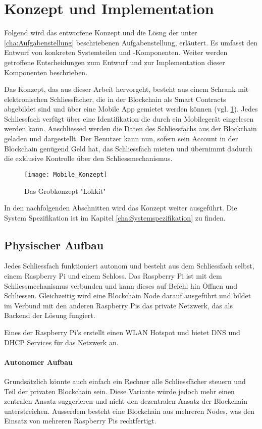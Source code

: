 \section{Konzept und Implementation}
\label{sec:Konzeption}
Folgend wird das entworfene Konzept und die Lösng der unter \ref{cha:Aufgabenstellung} beschriebenen Aufgabenstellung, erläutert. Es umfasst den Entwurf von konkreten Systemteilen und -Komponenten. Weiter werden getroffene Entscheidungen zum Entwurf und zur Implementation dieser Komponenten beschrieben.

Das Konzept, das aus dieser Arbeit hervorgeht, besteht aus einem Schrank mit elektronischen Schliessfächer, die in der Blockchain als Smart Contracts abgebildet sind und über eine Mobile App gemietet werden können (vgl. \ref{fig:Grobkonzept}). Jedes Schliessfach verfügt über eine Identifikation die durch ein Mobilegerät eingelesen werden kann. Anschliessed werden die Daten des Schliessfachs aus der Blockchain geladen und dargestellt. Der Benutzer kann nun, sofern sein Account in der Blockchain genügend Geld hat, das Schliessfach mieten und übernimmt dadurch die exklusive Kontrolle über den Schliessmechanismus. 

\begin{figure}
\centering
\texttt{[image: Mobile\_Konzept]}
\caption{Das Grobkonzept "Lokkit"}
\label{fig:Grobkonzept}
\end{figure}

In den nachfolgenden Abschnitten wird das Konzept weiter ausgeführt. Die System Spezifikation ist im Kapitel \ref{cha:Systemspezifikation} zu finden.

\subsection{Physischer Aufbau}
Jedes Schliessfach funktioniert autonom und besteht aus dem Schliessfach selbst, einem Raspberry Pi und einem Schloss. Das Raspberry Pi ist mit dem Schliessmechanismus verbunden und kann dieses auf Befehl hin Öffnen und Schliessen. Gleichzeitig wird eine Blockchain Node darauf ausgeführt und bildet im Verbund mit den anderen Raspberry Pis das private Netzwerk, das als Backend der Lösung fungiert.

Eines der Raspberry Pi's erstellt einen WLAN Hotspot und bietet DNS und DHCP Services für das Netzwerk an.

\paragraph{Autonomer Aufbau}
Grundsätzlich könnte auch einfach ein Rechner alle Schliessfächer steuern und Teil der privaten Blockchain sein. Diese Variante würde jedoch mehr einen zentralen Ansatz suggerieren und nicht den dezentralen Ansatz der Blockchain unterstreichen. Ausserdem besteht eine Blockchain aus mehreren Nodes, was den Einsatz von mehreren Raspberry Pis rechtfertigt. 

